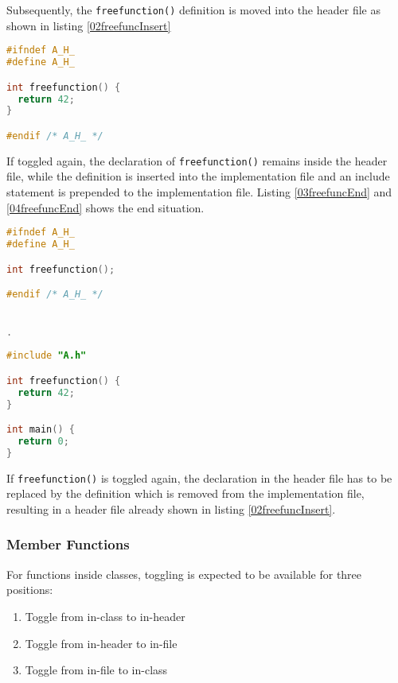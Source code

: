 Subsequently, the \texttt{freefunction()} definition is moved into the header
file as shown in listing \nolinebreak\ref{02freefuncInsert}

\begin{lstlisting}[caption={Inserted \texttt{freefunction()} in A.h},
label={02freefuncInsert}, language=C++]
#ifndef A_H_
#define A_H_

int freefunction() {
  return 42;
}

#endif /* A_H_ */
\end{lstlisting}

If toggled again, the declaration of \texttt{freefunction()} remains inside the
header file, while the definition is inserted into the implementation file and
an
include statement is prepended to the implementation file. Listing
\nolinebreak\ref{03freefuncEnd} and \ref{04freefuncEnd} shows the end
situation.

\vspace{0.5cm}
\begin{minipage}{.48\textwidth}
\lstset{xrightmargin=0.5cm}
\begin{lstlisting}[caption={A.h, inserted decla- ration},
label={03freefuncEnd}, language=C++]
#ifndef A_H_
#define A_H_

int freefunction();

#endif /* A_H_ */


.
\end{lstlisting}
\end{minipage}%
\begin{minipage}{.48\textwidth}
\lstset{xleftmargin=0.5cm}
\begin{lstlisting}[caption={A.cpp, inserted definition},
label={04freefuncEnd},language=C++]
#include "A.h"

int freefunction() {
  return 42;
}

int main() {
  return 0;
}
\end{lstlisting}
\end{minipage}

If \texttt{freefunction()} is toggled again, the declaration in the header file
has to be replaced by the definition which is removed from the implementation
file, resulting in a header file already shown in listing
\nolinebreak\ref{02freefuncInsert}.

\subsubsection{Member Functions}
For functions inside classes, toggling is expected to be available for three 
positions:
\begin{enumerate}
\item Toggle from in-class to in-header
\item Toggle from in-header to in-file
\item Toggle from in-file to in-class
\end{enumerate}

